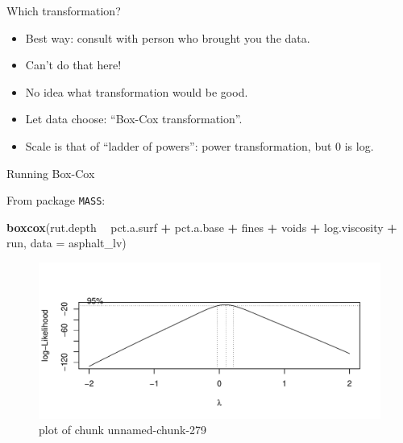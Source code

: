 \documentclass[ignorenonframetext,]{beamer}
\newenvironment{Shaded}{\begin{snugshade}}{\end{snugshade}}
\newcommand{\DataTypeTok}[1]{\textcolor[rgb]{0.13,0.29,0.53}{#1}}
\newcommand{\KeywordTok}[1]{\textcolor[rgb]{0.13,0.29,0.53}{\textbf{#1}}}
\newcommand{\NormalTok}[1]{#1}
\newcommand{\OperatorTok}[1]{\textcolor[rgb]{0.81,0.36,0.00}{\textbf{#1}}}
\newcommand{\StringTok}[1]{\textcolor[rgb]{0.31,0.60,0.02}{#1}}
\providecommand{\tightlist}{%
  \setlength{\itemsep}{0pt}\setlength{\parskip}{0pt}}
\begin{document}
\begin{frame}{Which transformation?}
\protect\hypertarget{which-transformation}{}

\begin{itemize}
\tightlist
\item
  Best way: consult with person who brought you the data.
\item
  Can't do that here!
\item
  No idea what transformation would be good.
\item
  Let data choose: ``Box-Cox transformation''.
\item
  Scale is that of ``ladder of powers'': power transformation, but 0 is
  log.
\end{itemize}

\end{frame}

\begin{frame}[fragile]{Running Box-Cox}
\protect\hypertarget{running-box-cox}{}

From package \texttt{MASS}:

\begin{Shaded}
\begin{Highlighting}[]
\KeywordTok{boxcox}\NormalTok{(rut.depth }\OperatorTok{~}\StringTok{ }\NormalTok{pct.a.surf }\OperatorTok{+}\StringTok{ }\NormalTok{pct.a.base }\OperatorTok{+}\StringTok{ }\NormalTok{fines }\OperatorTok{+}\StringTok{ }\NormalTok{voids }\OperatorTok{+}
\StringTok{  }\NormalTok{log.viscosity }\OperatorTok{+}\StringTok{ }\NormalTok{run, }\DataTypeTok{data =}\NormalTok{ asphalt_lv)}
\end{Highlighting}
\end{Shaded}

\begin{figure}
\centering
\includegraphics{figure/unnamed-chunk-279-1.pdf}
\caption{plot of chunk unnamed-chunk-279}
\end{figure}

\end{frame}
\end{document}
